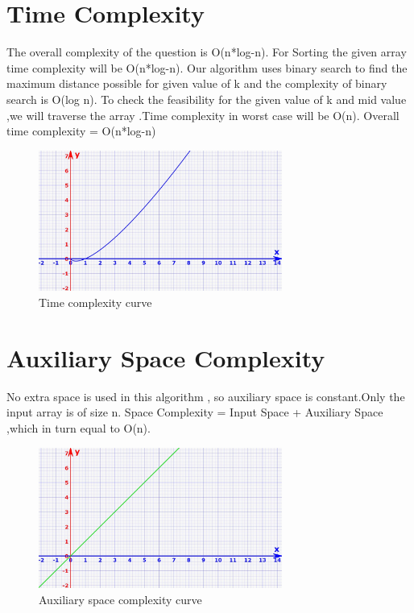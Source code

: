 \documentclass[conference]{IEEEtran}
\begin{document}
\section{\textbf {Time Complexity}}
\noindent The overall complexity of the question is O(n*log-n).
For Sorting the given array time complexity will be O(n*log-n).
Our algorithm uses binary search to find the maximum distance possible for given value of k and the complexity of binary search is O(log n).
To check the feasibility for the given value of k and mid value ,we will traverse the array .Time complexity in worst case will be O(n).
Overall time complexity = O(n*log-n)  


\begin{figure}[htp]
    \centering
    \includegraphics[width=8cm]{TimeComplexity}
    \caption{Time complexity curve}
    \label{fig:TimeComplexity.jpeg}
\end{figure}

\section{\textbf {Auxiliary Space Complexity}}
\noindent No extra space is used in this algorithm , so auxiliary space is constant.Only the input array is of size n.
Space Complexity = Input Space + Auxiliary Space ,which in turn equal to O(n).


\begin{figure}[htp]
    \centering
    \includegraphics[width=8cm]{AuxiliarySpaceComplexity}
    \caption{Auxiliary space complexity curve}
    \label{fig:AuxiliarySpaceComplexity}
\end{figure}
\end{document}
